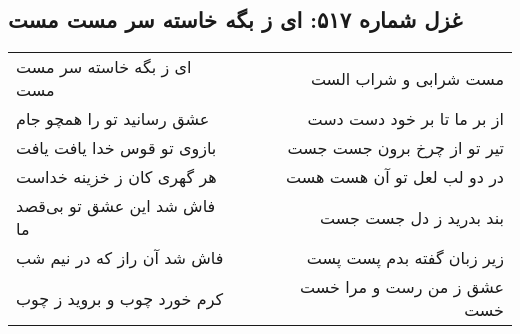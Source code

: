 \begin{center}
\section*{غزل شماره ۵۱۷: ای ز بگه خاسته سر مست مست}
\label{sec:0517}
\begin{longtable}{l p{0.5cm} r}
ای ز بگه خاسته سر مست مست
&&
مست شرابی و شراب الست
\\
عشق رسانید تو را همچو جام
&&
از بر ما تا بر خود دست دست
\\
بازوی تو قوس خدا یافت یافت
&&
تیر تو از چرخ برون جست جست
\\
هر گهری کان ز خزینه خداست
&&
در دو لب لعل تو آن هست هست
\\
فاش شد این عشق تو بی‌قصد ما
&&
بند بدرید ز دل جست جست
\\
فاش شد آن راز که در نیم شب
&&
زیر زبان گفته بدم پست پست
\\
کرم خورد چوب و بروید ز چوب
&&
عشق ز من رست و مرا خست خست
\\
\end{longtable}
\end{center}
